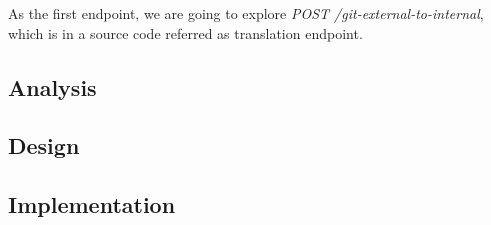 \documentclass[../main.tex]{subfiles}
\begin{document}
As the first endpoint, we are going to explore \textit{POST /git-external-to-internal}, which is in a source code referred as translation endpoint.

\subsection{Analysis}
\label{subsection:translation-analysis}


\subsection{Design}


\subsection{Implementation}

\end{document}
